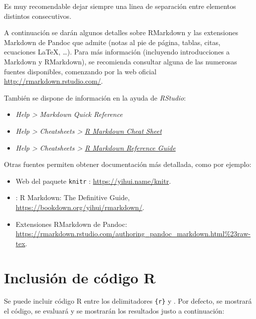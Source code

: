 \documentclass[]{book}
\theoremstyle{definition}
\theoremstyle{definition}
\theoremstyle{definition}
\theoremstyle{remark}
\begin{document}
Es muy recomendable dejar siempre una linea de separación entre
elementos distintos consecutivos.

A continuación se darán algunos detalles sobre RMarkdown y las
extensiones Markdown de Pandoc que admite (notas al pie de página,
tablas, citas, ecuaciones LaTeX, \ldots{}). Para más información
(incluyendo introducciones a Markdown y RMarkdown), se recomienda
consultar alguna de las numerosas fuentes disponibles, comenzando por la
web oficial \url{http://rmarkdown.rstudio.com/}.

También se dispone de información en la ayuda de \emph{RStudio}:

\begin{itemize}
\item
  \emph{Help \textgreater{} Markdown Quick Reference}
\item
  \emph{Help \textgreater{} Cheatsheets \textgreater{}
  \href{https://www.rstudio.org/links/r_markdown_cheat_sheet}{R Markdown
  Cheat Sheet}}
\item
  \emph{Help \textgreater{} Cheatsheets \textgreater{}
  \href{https://www.rstudio.com/wp-content/uploads/2015/03/rmarkdown-reference.pdf}{R
  Markdown Reference Guide}}
\end{itemize}

Otras fuentes permiten obtener documentación más detallada, como por
ejemplo:

\begin{itemize}
\item
  Web del paquete \texttt{knitr} \citep{R-knitr}:
  \url{https://yihui.name/knitr}.
\item
  \citet{xie2018r} : R Markdown: The Definitive Guide,
  \url{https://bookdown.org/yihui/rmarkdown/}.
\item
  Extensiones RMarkdown de Pandoc:
  \url{https://rmarkdown.rstudio.com/authoring_pandoc_markdown.html\%23raw-tex}.
\end{itemize}

\section{Inclusión de código R}\label{codigormd}

Se puede incluir código R entre los delimitadores
\texttt{\textasciigrave{}\textasciigrave{}\textasciigrave{}\{r\}} y
\texttt{\textasciigrave{}\textasciigrave{}\textasciigrave{}}. Por
defecto, se mostrará el código, se evaluará y se mostrarán los
resultados justo a continuación:
\end{document}

